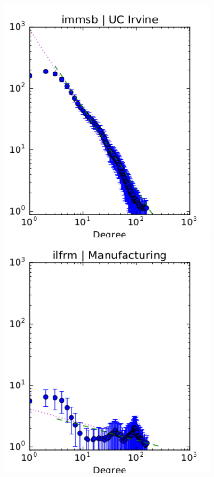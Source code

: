 \begin{figure}[h]
	\includegraphics[scale=0.4]{img/immsb_irvine_d}
	\endminipage
	\vspace{-0.4cm}
	\includegraphics[scale=0.4]{img/ilfrm_manufacturing_d}

\end{figure}
